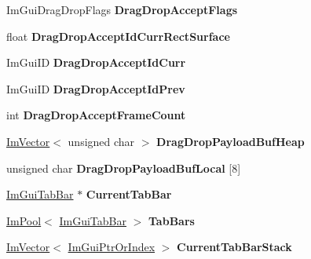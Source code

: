 \begin{DoxyCompactItemize}
Im\+Gui\+Drag\+Drop\+Flags {\bfseries Drag\+Drop\+Accept\+Flags}
\item 
\mbox{\label{structImGuiContext_a4a3aa38a5b88e2be8fd73b29e39e3fbc}} 
float {\bfseries Drag\+Drop\+Accept\+Id\+Curr\+Rect\+Surface}
\item 
\mbox{\label{structImGuiContext_af0ac51e2f6bd98443fe5f135f3e2ecac}} 
Im\+Gui\+ID {\bfseries Drag\+Drop\+Accept\+Id\+Curr}
\item 
\mbox{\label{structImGuiContext_ab835f6cb1536a4e91b6d589a100612f9}} 
Im\+Gui\+ID {\bfseries Drag\+Drop\+Accept\+Id\+Prev}
\item 
\mbox{\label{structImGuiContext_a8163ed15c1f157390a3215dcb28feb9e}} 
int {\bfseries Drag\+Drop\+Accept\+Frame\+Count}
\item 
\mbox{\label{structImGuiContext_af4797d5b38c5c659d1aa0160d46549d8}} 
\hyperlink{structImVector}{Im\+Vector}$<$ unsigned char $>$ {\bfseries Drag\+Drop\+Payload\+Buf\+Heap}
\item 
\mbox{\label{structImGuiContext_ae4f0ffccf3107a3eb4e1ba3d6258c3e4}} 
unsigned char {\bfseries Drag\+Drop\+Payload\+Buf\+Local} \mbox{[}8\mbox{]}
\item 
\mbox{\label{structImGuiContext_ae0289628e3d91b5e56ed46369c55ef47}} 
\hyperlink{structImGuiTabBar}{Im\+Gui\+Tab\+Bar} $\ast$ {\bfseries Current\+Tab\+Bar}
\item 
\mbox{\label{structImGuiContext_a8ed1e9dd2d6cf69e7aaded9a70c5c712}} 
\hyperlink{structImPool}{Im\+Pool}$<$ \hyperlink{structImGuiTabBar}{Im\+Gui\+Tab\+Bar} $>$ {\bfseries Tab\+Bars}
\item 
\mbox{\label{structImGuiContext_a50e1ec3f51a0a362b770b6e4630b085c}} 
\hyperlink{structImVector}{Im\+Vector}$<$ \hyperlink{structImGuiPtrOrIndex}{Im\+Gui\+Ptr\+Or\+Index} $>$ {\bfseries Current\+Tab\+Bar\+Stack}
\item 
\mbox{\label{structImGuiContext_a835de1c6d4630fbe87831dcc1db80715}} 

\end{DoxyCompactItemize}

